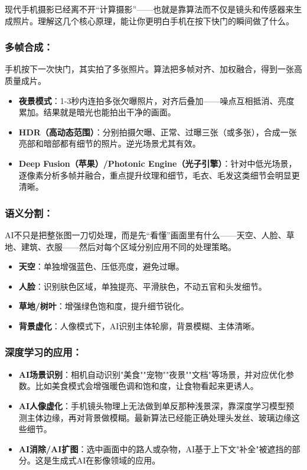 
现代手机摄影已经离不开“计算摄影”——也就是靠算法而不仅是镜头和传感器来生成照片。理解这几个核心原理，能让你更明白手机在按下快门的瞬间做了什么。

\subsubsection*{多帧合成：}

手机按下一次快门，其实拍了多张照片。算法把多帧对齐、加权融合，得到一张高质量成片。

\begin{itemize}
  \item \textbf{夜景模式}：1-3秒内连拍多张欠曝照片，对齐后叠加——噪点互相抵消、亮度累加。结果就是暗光也能拍出干净的画面。
  \item \textbf{HDR（高动态范围）}：分别拍摄欠曝、正常、过曝三张（或多张），合成一张亮部和暗部都有细节的照片。逆光场景尤其有效。
  \item \textbf{Deep Fusion（苹果）/Photonic Engine（光子引擎）}：针对中低光场景，逐像素分析多帧并融合，重点提升纹理和细节，毛衣、毛发这类细节会明显更清晰。
\end{itemize}

\subsubsection*{语义分割：}

AI不只是把整张图一刀切处理，而是先“看懂”画面里有什么——天空、人脸、草地、建筑、衣服——然后对每个区域分别应用不同的处理策略。

\begin{itemize}
  \item \textbf{天空}：单独增强蓝色、压低亮度，避免过曝。
  \item \textbf{人脸}：识别肤色区域，单独提亮、平滑肤色，不动五官和头发细节。
  \item \textbf{草地/树叶}：增强绿色饱和度，提升细节锐化。
  \item \textbf{背景虚化}：人像模式下，AI识别主体轮廓，背景模糊、主体清晰。
\end{itemize}

\subsubsection*{深度学习的应用：}

\begin{itemize}
  \item \textbf{AI场景识别}：相机自动识别"美食""宠物""夜景""文档"等场景，并对应优化参数。比如美食模式会增强暖色调和饱和度，让食物看起来更诱人。
  \item \textbf{AI人像虚化}：手机镜头物理上无法做到单反那种浅景深，靠深度学习模型预测主体边缘，再对背景做模糊。最新算法已经能正确处理头发丝、玻璃边缘这些细节。
  \item \textbf{AI消除/AI扩图}：选中画面中的路人或杂物，AI基于上下文"补全"被遮挡的部分。这是生成式AI在影像领域的应用。
\end{itemize}

